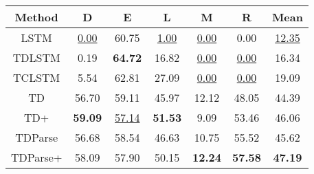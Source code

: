 \begin{tabular}{|c|c|c|c|c|c|c|}
\hline
Method  &   D &  E &  L &  M &  R  &   Mean \\
\hline
LSTM &   \underline{0.00} &     60.75 &    \underline{1.00} &      \underline{0.00} &        0.00 &  \underline{12.35} \\
\hline
TDLSTM &   0.19 &     \textbf{64.72} &   16.82 &      \underline{0.00} &        \underline{0.00} &  16.34 \\
\hline
TCLSTM &   5.54 &     62.81 &   27.09 &      \underline{0.00} &        \underline{0.00} &  19.09 \\
\hline
TD &  56.70 &     59.11 &   45.97 &     12.12 &       48.05 &  44.39 \\
\hline
TD+ &  \textbf{59.09} &     \underline{57.14} &   \textbf{51.53} &      9.09 &       53.46 &  46.06 \\
\hline
TDParse &  56.68 &     58.54 &   46.63 &     10.75 &       55.52 &  45.62 \\
\hline
TDParse+ &  58.09 &     57.90 &   50.15 &     \textbf{12.24} &       \textbf{57.58} &  \textbf{47.19} \\
\hline
\end{tabular}
